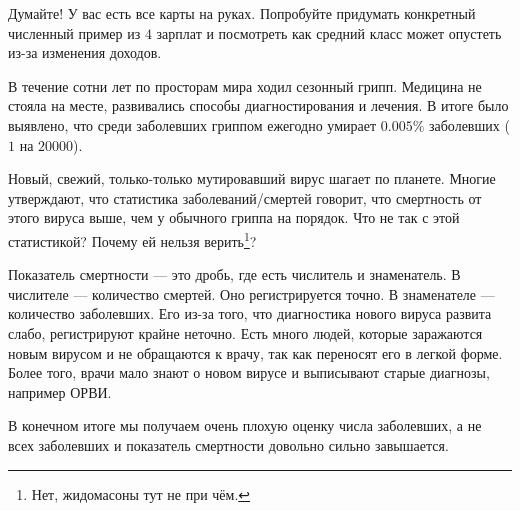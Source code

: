 \documentclass[12pt, a4paper, oneside]{article}
\theoremstyle{plain} %
\theoremstyle{definition}
\newcounter{problem}%
\renewcommand{\theproblem}{\arabic{problem}}
\newenvironment{problem}{
\addtocounter{problem}{1}\noindent{ \color{titleblue} \large \bfseries Упражнение~\theproblem \vspace{1ex} \newline}
}{ }
\begin{document}
\begin{solution}
Думайте! У вас есть все карты на руках. Попробуйте придумать конкретный численный пример из $4$ зарплат и посмотреть как средний класс может опустеть из-за изменения доходов.
\end{solution} 

\begin{problem} 
В течение сотни лет по просторам мира ходил сезонный грипп. Медицина не стояла на месте, развивались способы диагностирования и лечения. В итоге было выявлено, что среди заболевших гриппом ежегодно умирает  $0.005\%$ заболевших ($1$ на $20000$). 

Новый, свежий, только-только мутировавший вирус шагает по планете. Многие утверждают, что статистика заболеваний/смертей говорит, что смертность от этого вируса выше, чем у обычного гриппа на порядок. Что не так с этой статистикой? Почему ей нельзя верить\footnote{Нет, жидомасоны тут не при чём.}? 
\end{problem} 

\begin{solution}
Показатель смертности --- это дробь, где есть числитель и знаменатель. В числителе --- количество смертей. Оно регистрируется точно. В знаменателе --- количество заболевших. Его из-за того, что диагностика нового вируса развита слабо, регистрируют крайне неточно. Есть много людей, которые заражаются новым вирусом и не обращаются к врачу, так как переносят его в легкой форме. Более того, врачи мало знают о новом вирусе и выписывают старые диагнозы, например ОРВИ. 

В конечном итоге мы получаем очень плохую оценку числа заболевших, а не всех заболевших и показатель смертности довольно сильно завышается. 
\end{solution}
\end{document}
